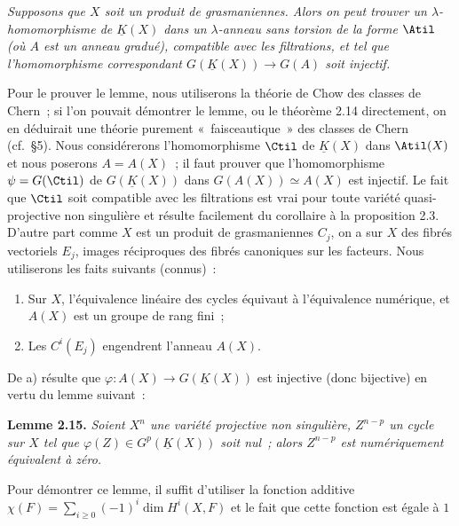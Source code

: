 \emph{Supposons que $X$ soit un produit de grasmaniennes. Alors on peut trouver un $\lambda$-homomorphisme de $\underline K(X)$ dans un $\lambda$-anneau sans torsion de la forme $\Atil$ (où $A$ est un anneau gradué), compatible avec les filtrations, et tel que l'homomorphisme correspondant $G(\underline K(X))\longrightarrow G(A)$ soit injectif.}

Pour le prouver le lemme, nous utiliserons la théorie de Chow des classes de Chern~; si l'on pouvait démontrer le lemme, ou le théorème 2.14 directement, on en déduirait une théorie purement «~faisceautique~» des classes de Chern (cf.\ \S 5). Nous considérerons l'homomorphisme $\Ctil$ de $\underline K(X)$ dans $\Atil(X)$ et nous poserons $A=A(X)$~; il faut prouver que l'homomorphisme $\psi=G(\Ctil)$ de $G(\underline K(X))$ dans $G(A(X))\simeq A(X)$ est injectif. Le fait que $\Ctil$ soit compatible avec les filtrations est vrai pour toute variété quasi-projective non singulière et résulte facilement du corollaire à la proposition 2.3. D'autre part comme $X$ est un produit de grasmaniennes $C_j$, on a sur $X$ des fibrés vectoriels $E_j$, images réciproques des fibrés canoniques sur les facteurs. Nous utiliserons les faits suivants (connus)~:
\begin{enumerate}[label=\alph*)]
\item Sur $X$, l'équivalence linéaire des cycles équivaut à l'équivalence numérique, et $A(X)$ est un groupe de rang fini~;
\item Les $C^i(E_j)$ engendrent l'anneau $A(X)$.
\end{enumerate}
De a) résulte que $\varphi:A(X)\longrightarrow G(\underline K(X))$ est injective (donc bijective) en vertu du lemme suivant~:

\textbf{Lemme 2.15.} \emph{Soient $X^n$ une variété projective non singulière, $Z^{n-p}$ un cycle sur $X$ tel que $\varphi(Z)\in G^p(\underline K(X))$ soit nul~; alors $Z^{n-p}$ est numériquement équivalent à zéro.}

Pour démontrer ce lemme, il suffit d'utiliser la fonction additive $\chi(F)=\sum_{i\geq0}(-1)^i\dim H^i(X,F)$ et le fait que cette fonction est égale à $1$
